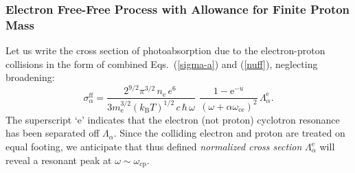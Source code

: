 \documentclass{emulateapj}
\newcommand{\beq}{\begin{equation}}
\newcommand{\eeq}{\end{equation}}
\newcommand{\mel}{m_\mathrm{e}}
\newcommand{\omc}{\omega_\mathrm{ce}}
\newcommand{\omp}{\omega_\mathrm{cp}}
\newcommand{\kB}{k_\mathrm{B}}
\begin{document}
       \subsubsection{Electron Free-Free Process with Allowance for
        Finite Proton Mass}
\label{sect-ff}
%
Let us write the cross section of photoabsorption 
due to the electron-proton collisions in the form 
of combined Eqs.\ (\ref{sigma-a}) and (\ref{nuff}), 
neglecting broadening:
\beq
   \sigma_\alpha^\mathrm{ff} =
          \frac{2^{9/2} \pi^{3/2}\,
          n_\mathrm{e}\,e^6\
          }{
          3 \mel^{3/2} (\kB T)^{1/2}\, 
             c\,\hbar \,\omega
          }\,\
          \frac{ 1-\mathrm{e}^{-u}
          }{ 
     (\omega+\alpha\omc)^2}\,
         \Lambda_\alpha^\mathrm{e}.
\label{sigma-e}
\eeq
The superscript `e' indicates that 
the electron (not proton) cyclotron resonance has been 
separated off $\Lambda_\alpha$. Since the colliding electron
and proton are treated on equal footing, we anticipate that
thus defined \emph{normalized cross section}
 $\Lambda_\alpha^\mathrm{e}$ will reveal
a resonant peak at $\omega\sim\omp$.
\end{document}
